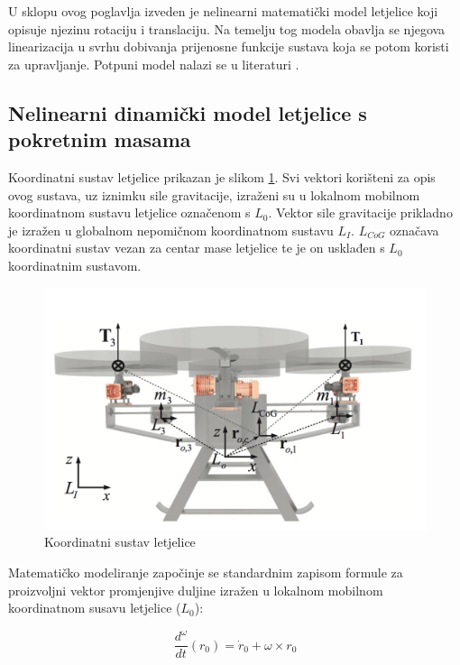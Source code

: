 \documentclass[11pt,a4paper]{article}
\begin{document}
U sklopu ovog poglavlja izveden je nelinearni matematički model letjelice koji opisuje njezinu rotaciju i translaciju. Na temelju tog modela obavlja se njegova linearizacija u svrhu dobivanja prijenosne funkcije sustava koja se potom koristi za upravljanje. Potpuni model nalazi se u literaturi \cite{haus3}.

\medskip

\subsection{Nelinearni dinamički model letjelice s pokretnim masama}

Koordinatni sustav letjelice prikazan je slikom \ref{fig:mod}. Svi vektori korišteni za opis ovog sustava, uz iznimku sile gravitacije, izraženi su u lokalnom mobilnom koordinatnom sustavu letjelice označenom s $L_{0}$. Vektor sile gravitacije prikladno je izražen u globalnom nepomičnom koordinatnom sustavu $L_{I}$. $L_{CoG}$ označava koordinatni sustav vezan za centar mase letjelice te je on usklađen s $L_{0}$ koordinatnim sustavom.


\begin{figure}[H]
	\centering
	\includegraphics[scale=0.23]{model}
	\caption{Koordinatni sustav letjelice \cite{haus1}}
	\label{fig:mod}
\end{figure}

Matematičko modeliranje započinje se standardnim zapisom formule za proizvoljni vektor promjenjive duljine izražen u lokalnom mobilnom koordinatnom susavu letjelice ($L_{0}$):

\begin{equation}
\frac{d^{\omega}}{dt}({r}_{0}) =  {\dot{r}}_{0} + {\omega} \times {r}_{0} 
\label{eq:r0}
\end{equation}
\end{document}
